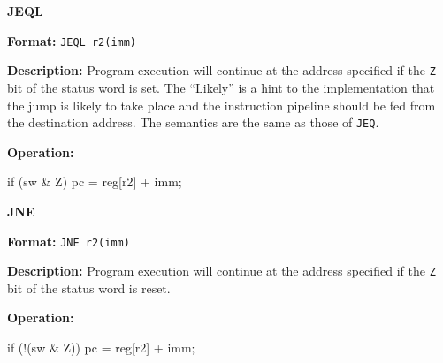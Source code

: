 \noindent\textsf{\textbf{\Large JEQL}}\par
{}\par\begin{indented}{\bf Format:}
{\tt JEQL r2(imm)}\par\vspace{3ex}
\end{indented}\vspace{4ex}
\begin{indented}{\bf Description:}
Program execution will continue at the address specified if the {\tt Z} bit
of the status word is set.  The ``Likely'' is a hint to the implementation
that the jump is likely to take place and the instruction pipeline should
be fed from the destination address.  The semantics are the same as those
of {\tt JEQ}.
\end{indented}
\begin{indented}{\bf Operation:}\vspace{.8ex}
\begin{verbatimtab}
if (sw & Z) {
    pc = reg[r2] + imm;
}
\end{verbatimtab}
\end{indented}
\vspace{2em}

\newpage
\noindent\textsf{\textbf{\Large JNE}}\par
{}\par\begin{indented}{\bf Format:}
{\tt JNE r2(imm)}\par\vspace{3ex}
\end{indented}\vspace{4ex}
\begin{indented}{\bf Description:}
Program execution will continue at the address specified if the {\tt Z} bit
of the status word is reset.
\end{indented}
\begin{indented}{\bf Operation:}\vspace{.8ex}
\begin{verbatimtab}
if (!(sw & Z)) {
    pc = reg[r2] + imm;
}
\end{verbatimtab}
\end{indented}
\vspace{2em}

